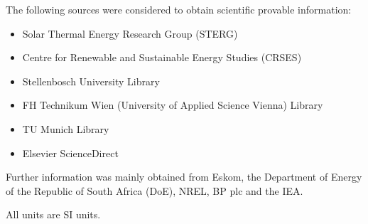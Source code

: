The following sources were considered to obtain scientific provable information:
\begin{itemize}
\item Solar Thermal Energy Research Group (STERG)
\item Centre for Renewable and Sustainable Energy Studies (CRSES)
\item Stellenbosch University Library
\item FH Technikum Wien (University of Applied Science Vienna) Library
\item TU Munich Library
\item Elsevier ScienceDirect
\end{itemize}


Further information was mainly obtained from Eskom, the Department of Energy of the Republic of South Africa (DoE), \ac{NREL}, BP plc and the \ac{IEA}.


All units are SI units.